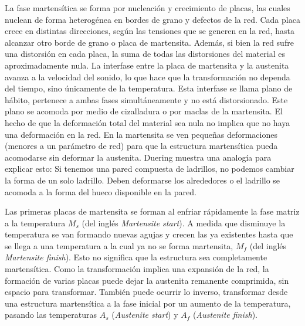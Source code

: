 \documentclass[a4paper,12pt,fleqn,twoside,openany]{book}
\begin{document}
La fase martensítica se forma por nucleación y crecimiento de placas, las cuales nuclean de forma heterogénea en bordes de grano y defectos de la red. 
Cada placa crece en distintas direcciones, según las tensiones que se generen en la red, hasta alcanzar otro borde de grano o placa de martensita. 
Además, si bien la red sufre una distorsión en cada placa, la suma de todas las distorsiones del material es aproximadamente nula. 
La interfase entre la placa de martensita y la austenita avanza a la velocidad del sonido, lo que hace que la transformación no dependa del 
tiempo, sino únicamente de la temperatura. Esta interfase se llama plano de hábito, pertenece a ambas fases 
simultáneamente y no está distorsionado. Este plano se acomoda por medio de cizalladura o por maclas de la martensita. 
El hecho de que la deformación total del material sea nula no implica que no haya una deformación en la red. En la martensita se ven pequeñas 
deformaciones (menores a un parámetro de red) para que la estructura martensítica pueda acomodarse sin deformar la austenita. 
Duering \cite{duering} muestra una analogía para explicar esto: Si tenemos una pared compuesta de ladrillos, no podemos cambiar la forma de un solo ladrillo. 
Deben deformarse los alrededores o el ladrillo se acomoda a la forma del hueco disponible en la pared.


Las primeras placas de martensita se forman al enfriar rápidamente la fase matriz a la temperatura $M_{s}$ (del inglés \textit{Martensite start}). 
A medida que disminuye la temperatura se van formando nuevas agujas y crecen las ya existentes hasta que se llega a una temperatura 
a la cual ya no se forma martensita, $M_{f}$ (del inglés \textit{Martensite finish}). Esto no significa que la estructura sea completamente martensítica. 
Como la transformación implica una expansión de la red, la formación de varias placas puede dejar la austenita remanente comprimida, 
sin espacio para transformar. También puede ocurrir lo inverso, transformar desde una estructura martensítica a la fase inicial 
por un aumento de la temperatura, pasando las temperaturas $A_{s}$ (\textit{Austenite start}) y $A_{f}$ (\textit{Austenite finish}).

  
\end{document}
